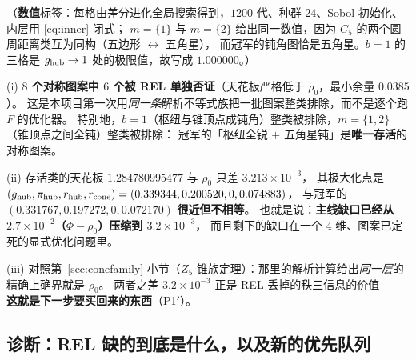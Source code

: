（\textbf{数值}标签：每格由差分进化全局搜索得到，$1200$ 代、种群 $24$、Sobol 初始化、内层用 \eqref{eq:inner} 闭式；
$m=\{1\}$ 与 $m=\{2\}$ 给出同一数值，因为 $C_5$ 的两个圆周距离类互为同构（五边形 $\leftrightarrow$ 五角星），
而冠军的钝角图恰是五角星。$b=1$ 的三格是 $g_{\rm hub}\to1$ 处的极限值，故写成 $1.000000$。）

\begin{remark}[这张表读出的三件事]\label{rmk:symread}
(i) \textbf{$8$ 个对称图案中 $6$ 个被 REL 单独否证}（天花板严格低于 $\rho_0$，最小余量 $0.0385$）。
这是本项目第一次用\emph{同一条}解析不等式族把一批图案整类排除，而不是逐个跑 $F$ 的优化器。
特别地，$b=1$（枢纽与锥顶点成钝角）整类被排除，$m=\{1,2\}$（锥顶点之间全钝）整类被排除：
冠军的「枢纽全锐 $+$ 五角星钝」是\textbf{唯一存活}的对称图案。

(ii) 存活类的天花板 $1.284780995477$ 与 $\rho_0$ 只差 $3.213\times10^{-3}$，
其极大化点是 $(g_{\rm hub},\pi_{\rm hub},r_{\rm hub},r_{\rm cone})=(0.339344,0.200520,0,0.074883)$，
与冠军的 $(0.331767,0.197272,0,0.072170)$ \textbf{很近但不相等}。
也就是说：\textbf{主线缺口已经从 $2.7\times10^{-2}$（$\Phi-\rho_0$）压缩到 $3.2\times10^{-3}$}，
而且剩下的缺口在一个 $4$ 维、图案已定死的显式优化问题里。

(iii) 对照第~\ref{sec:conefamily} 小节（$Z_5$-锥族定理）：那里的解析计算给出\emph{同一层}的精确上确界就是 $\rho_0$。
两者之差 $3.2\times10^{-3}$ 正是 REL 丢掉的秩三信息的价值——
\textbf{这就是下一步要买回来的东西}（P1$'$）。
\end{remark}

\subsection{诊断：REL 缺的到底是什么，以及新的优先队列}\label{sec:diag}

